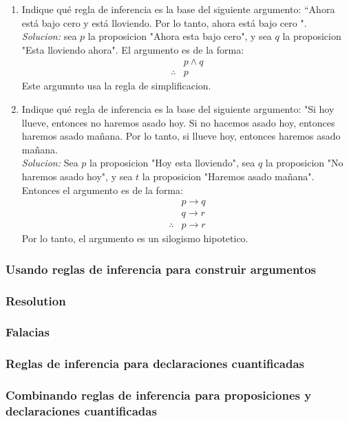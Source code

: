 \documentclass[]{article}
\begin{document}
\begin{enumerate}
	\item Indique qué regla de inferencia es la base del siguiente argumento: “Ahora está bajo cero y está lloviendo. Por lo tanto, ahora está bajo cero ".\\
	\textit{Solucion:} sea $p$ la proposicion "Ahora esta bajo cero", y sea $q$ la proposicion "Esta lloviendo ahora". El argumento es de la forma:
	\begin{equation*}
		\begin{aligned}
			&p \wedge q\\
			\therefore &p
		\end{aligned}
	\end{equation*}
	Este argumnto usa la regla de simplificacion.

	\item Indique qué regla de inferencia es la base del siguiente argumento:
	"Si hoy llueve, entonces no haremos asado hoy. Si no hacemos asado hoy, entonces haremos asado mañana. Por lo tanto, si llueve hoy, entonces haremos asado mañana.\\
	\textit{Solucion:} Sea $p$ la proposicion "Hoy esta lloviendo", sea $q$ la proposicion "No haremos asado hoy", y sea $t$ la proposicion "Haremos asado mañana". Entonces el argumento es de la forma:
	\begin{equation*}
		\begin{aligned}
			&p \rightarrow q\\
			&q \rightarrow r\\
			\therefore &p \rightarrow r
		\end{aligned}
	\end{equation*}
	Por lo tanto, el argumento es un silogismo hipotetico.
\end{enumerate}

\subsubsection*{Usando reglas de inferencia para construir argumentos}
\subsubsection*{Resolution}
\subsubsection*{Falacias}
\subsubsection*{Reglas de inferencia para declaraciones cuantificadas}
\subsubsection*{Combinando reglas de inferencia para proposiciones y declaraciones cuantificadas}
\end{document}
